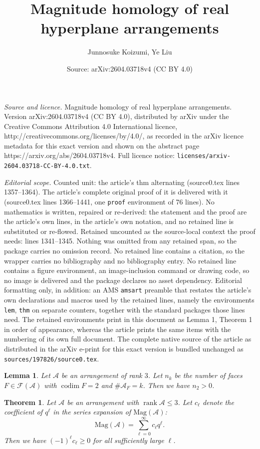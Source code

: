 \documentclass[10pt,a4paper]{amsart}
\title{Magnitude homology of real hyperplane arrangements}
\author{Junnosuke Koizumi, Ye Liu}
\date{Source: arXiv:2604.03718v4 (CC BY 4.0)}
\newtheorem{lem}{Lemma}
\newtheorem{thm}{Theorem}
\newcommand{\A}{\mathcal{A}}
\newcommand{\FF}{\mathcal{F}}
\newcommand{\Mag}{\mathrm{Mag}}
\DeclareMathOperator{\codim}{codim}
\DeclareMathOperator{\rank}{rank}
\begin{document}
\maketitle

\noindent\emph{Source and licence.} Magnitude homology of real hyperplane arrangements. Version arXiv:2604.03718v4 (CC BY 4.0), distributed by arXiv under the Creative Commons Attribution 4.0 International licence, http://creativecommons.org/licenses/by/4.0/, as recorded in the arXiv licence metadata for this exact version and shown on the abstract page https://arxiv.org/abs/2604.03718v4. Full licence notice: \texttt{licenses/arxiv-2604.03718-CC-BY-4.0.txt}.\par\smallskip

\noindent\textit{Editorial scope.} Counted unit: the article's thm alternating (source0.tex lines 1357--1364). The article's complete original proof of it is delivered with it (source0.tex lines 1366--1441, one \texttt{proof} environment of 76 lines). No mathematics is written, repaired or re-derived: the statement and the proof are the article's own lines, in the article's own notation, and no retained line is substituted or re-flowed.  Retained uncounted as the source-local context the proof needs: lines 1341--1345.  Nothing was omitted from any retained span, so the package carries no omission record.  No retained line contains a citation, so the wrapper carries no bibliography and no bibliography entry.  No retained line contains a figure environment, an image-inclusion command or drawing code, so no image is delivered and the package declares no asset dependency.  Editorial formatting only, in addition: an AMS \texttt{amsart} preamble that restates the article's own declarations and macros used by the retained lines, namely the environments \texttt{lem}, \texttt{thm} on separate counters, together with the standard packages those lines need.  The retained environments print in this document as Lemma 1, Theorem 1 in order of appearance, whereas the article prints the same items with the numbering of its own full document.  The complete native source of the article as distributed in the arXiv e-print for this exact version is bundled unchanged as \texttt{sources/197826/source0.tex}.
\begin{lem}\label{n2positive}
    Let $\A$ be an arrangement of rank $3$.
    Let $n_k$ be the number of faces $F\in \FF(\A)$ with $\codim F=2$ and $\#\A_F=k$.
    Then we have $n_2>0$.
\end{lem}

\begin{thm}\label{alternating}
    Let $\A$ be an arrangement with $\rank \A\leq 3$.
    Let $c_\ell$ denote the coefficient of $q^\ell$ in the series expansion of $\Mag(\A)$:
    \[
    \Mag(\A)=\sum_{\ell=0}^\infty c_\ell q^\ell.
    \]
    Then we have $(-1)^\ell c_\ell\geq 0$ for all sufficiently large $\ell$.
\end{thm}
\end{document}
